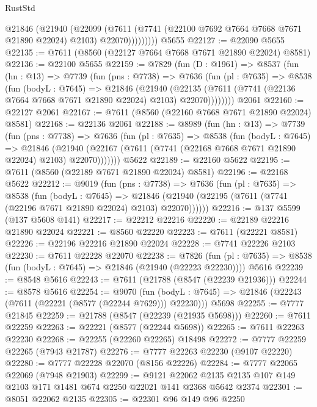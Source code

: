 \begin{lexlean}{RustStd}
\begin{coremodule}
{\begin{coremodule}
{{{{{{{{{{{{{{{{{{{{{{{{{{{{{{{{{{              @21846
                (@21940
                  (@22099
                    (@7611
                      (@7741 (@22100 @7692 @7664 @7668 @7671 @21890 @22024) @2103)
                      @22070)))))))))
    @5655
@22127 := @22090 @5655
@22135 := @7611 (@8560 (@22127 @7664 @7668 @7671 @21890 @22024) @8581)
@22136 := @22100 @5655
@22159 := @7829
    (fun (D : @1961) =>
    @8537
      (fun (hn : @13) =>
      @7739
        (fun (pns : @7738) =>
        @7636
          (fun (pl : @7635) =>
          @8538
            (fun (bodyL : @7645) =>
            @21846
              (@21940
                (@22135 (@7611 (@7741 (@22136 @7664 @7668 @7671 @21890 @22024) @2103) @22070))))))))
    @2061
@22160 := @22127 @2061
@22167 := @7611 (@8560 (@22160 @7668 @7671 @21890 @22024) @8581)
@22168 := @22136 @2061
@22188 := @8989
    (fun (hn : @13) =>
    @7739
      (fun (pns : @7738) =>
      @7636
        (fun (pl : @7635) =>
        @8538
          (fun (bodyL : @7645) =>
          @21846
            (@21940 (@22167 (@7611 (@7741 (@22168 @7668 @7671 @21890 @22024) @2103) @22070)))))))
    @5622
@22189 := @22160 @5622
@22195 := @7611 (@8560 (@22189 @7671 @21890 @22024) @8581)
@22196 := @22168 @5622
@22212 := @9019
    (fun (pns : @7738) =>
    @7636
      (fun (pl : @7635) =>
      @8538
        (fun (bodyL : @7645) =>
        @21846 (@21940 (@22195 (@7611 (@7741 (@22196 @7671 @21890 @22024) @2103) @22070))))))
@22216 := @137 @5599 (@137 @5608 @141)
@22217 := @22212 @22216
@22220 := @22189 @22216 @21890 @22024
@22221 := @8560 @22220
@22223 := @7611 (@22221 @8581)
@22226 := @22196 @22216 @21890 @22024
@22228 := @7741 @22226 @2103
@22230 := @7611 @22228 @22070
@22238 := @7826
    (fun (pl : @7635) => @8538 (fun (bodyL : @7645) => @21846 (@21940 (@22223 @22230))))
    @5616
@22239 := @8548 @5616
@22243 := @7611 (@21788 (@8547 (@22239 @21936)))
@22244 := @8578 @5616
@22254 := @9070
    (fun (bodyL : @7645) => @21846 (@22243 (@7611 (@22221 (@8577 (@22244 @7629))) @22230)))
    @5698
@22255 := @7777 @21845
@22259 := @21788 (@8547 (@22239 (@21935 @5698)))
@22260 := @7611 @22259
@22263 := @22221 (@8577 (@22244 @5698))
@22265 := @7611 @22263 @22230
@22268 := @22255 (@22260 @22265) @18498
@22272 := @7777 @22259 @22265 (@7943 @21787)
@22276 := @7777 @22263 @22230 (@9107 @22220)
@22280 := @7777 @22228 @22070 (@8156 @22226)
@22284 := @7777 @22065 @22069 (@7948 @21903)
@22299 := @9121
    @22062
    @2135
    @2135
    @107
    @149
    @2103
    @171
    @1481
    @674
    @2250
    @22021
    @141
    @2368
    @5642
    @2374
@22301 := @8051 @22062 @2135
@22305 := @22301 @96 @149 @96 @2250
}}}}}}}}}}}}}}}}}}}}}}}}}}}}}}}}}}
\end{coremodule}}
\end{coremodule}
\end{lexlean}
